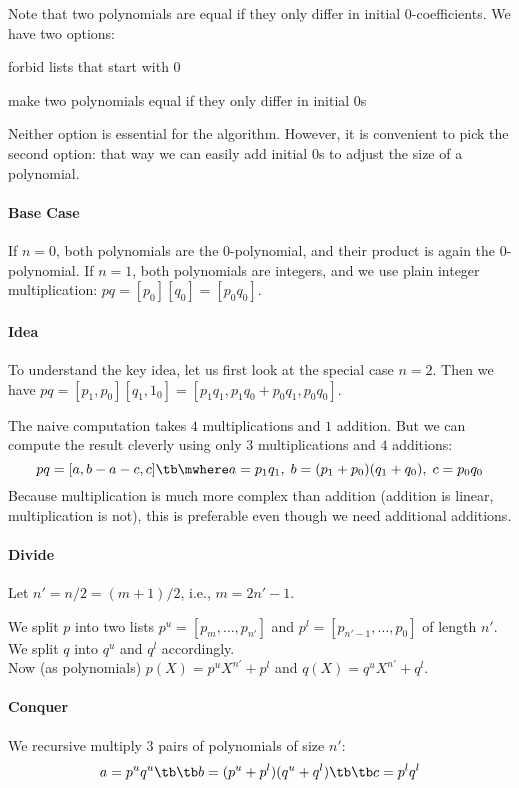 Note that two polynomials are equal if they only differ in initial $0$-coefficients.
We have two options:
\begin{compactitem}
\item forbid lists that start with $0$
\item make two polynomials equal if they only differ in initial $0$s
\end{compactitem}
Neither option is essential for the algorithm.
However, it is convenient to pick the second option: that way we can easily add initial $0$s to adjust the size of a polynomial.

\paragraph{Base Case}
If $n=0$, both polynomials are the $0$-polynomial, and their product is again the $0$-polynomial.
If $n=1$, both polynomials are integers, and we use plain integer multiplication: $pq=[p_0][q_0]=[p_0 q_0]$.

\paragraph{Idea}
To understand the key idea, let us first look at the special case $n=2$.
Then we have $pq=[p_1,p_0][q_1,1_0]=[p_1 q_1, p_1 q_0 + p_0 q_1, p_0 q_0]$.

The naive computation takes $4$ multiplications and $1$ addition.
But we can compute the result cleverly using only $3$ multiplications and $4$ additions:
\[pq=[a, b-a-c, c] \tb\mwhere a=p_1q_1, \;b=(p_1+p_0)(q_1+q_0),\;c=p_0 q_0\]
Because multiplication is much more complex than addition (addition is linear, multiplication is not), this is preferable even though we need additional additions.

\paragraph{Divide}
Let $n'=n/2=(m+1)/2$, i.e., $m=2n'-1$.

We split $p$ into two lists $p^u=[p_m,\ldots,p_{n'}]$ and $p^l=[p_{n'-1},\ldots,p_0]$ of length $n'$.
We split $q$ into $q^u$ and $q^l$ accordingly.\\

Now (as polynomials) $p(X)=p^u X^{n'}+p^l$ and $q(X)=q^u X^{n'}+q^l$.

\paragraph{Conquer}
We recursive multiply $3$ pairs of polynomials of size $n'$:
  \[a=p^u q^u \tb\tb b=(p^u+p^l)(q^u+q^l) \tb\tb c=p^l q^l\]

